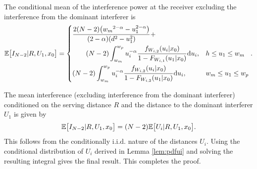 \documentclass[journal,draftclsnofoot,onecolumn,12pt]{IEEEtran}
\begin{document}
\begin{lemma}\label{lem:eI}
The conditional mean of the interference power at the receiver excluding the interference from the dominant interferer is 
\begin{align}
{\mathbb{E}}\big[I_{N-2}| R, U_1, x_0 \big] = 
\begin{dcases}
\frac{2(N-2) \big({w_m}^{2-\alpha} - u_1^{2-\alpha} \big)}{(2-\alpha)(d^2- u_1^2)} + \\
\qquad (N-2)\int_{w_m}^{w_p} u_i^{-\alpha}\frac{f_{W_{i,2}}(u_i|x_0)}{1-F_{W_{i,1}}(u_1|x_0)} {\rm d}u_i, &h \leq u_1 \leq w_m \\
(N-2)\int_{w_m}^{w_p} u_i^{-\alpha}\frac{f_{W_{i,2}}(u_i|x_0)}{1-F_{W_{i,2}}(u_1|x_0)} {\rm d}u_i,      &w_m \leq u_1 \leq w_p
\end{dcases}.
\end{align}
\end{lemma}
\begin{IEEEproof}
The mean interference (excluding interference from the dominant interferer) conditioned on the serving distance $R$ and the distance to the dominant interferer $U_1$ is given by
\begin{align}
{\mathbb{E}}\big[ I_{N-2} | R, U_1, x_0 \big] = (N-2) {\mathbb{E}} \big[ U_i | R, U_1, x_0 \big ].
\end{align}
This follows from the conditionally i.i.d. nature of the distances $U_i$. Using the conditional distribution of $U_i$ derived in Lemma \ref{lem:pdfui} and solving the resulting integral gives the final result. This completes the proof.
\end{IEEEproof}
\end{document}
